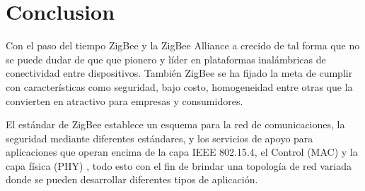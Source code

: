 \documentclass[10pt,journal,compsoc]{IEEEtran}
\begin{document}




\section{Conclusion}


Con el paso del tiempo ZigBee y la ZigBee Alliance a crecido de tal forma que no se puede dudar de que que pionero y líder en plataformas inalámbricas de conectividad entre dispositivos. También ZigBee se ha fijado la meta de cumplir con características como seguridad, bajo costo, homogeneidad entre otras que la convierten en atractivo para empresas y consumidores. 

El estándar de ZigBee establece un esquema para la red de comunicaciones, la seguridad mediante diferentes estándares, y los servicios de apoyo para aplicaciones que operan encima de la capa IEEE 802.15.4, el Control (MAC) y la capa física (PHY) , todo esto con el fin de brindar  una topología de red variada donde se pueden desarrollar diferentes tipos de aplicación. 



%
\end{document}

